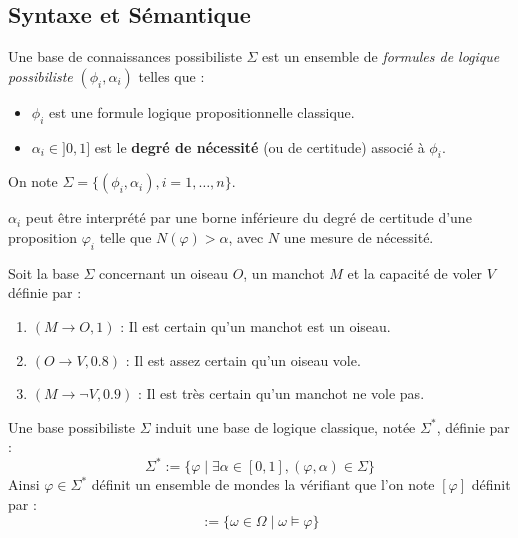 \subsection{Syntaxe et Sémantique}

\begin{definition}
    Une base de connaissances possibiliste $\Sigma$ est un ensemble de \emph{formules de logique 
    possibiliste} $(\phi_i, \alpha_i)$ telles que :
    \begin{itemize}
        \item $\phi_i$ est une formule logique propositionnelle classique.
        \item $\alpha_i \in ]0, 1]$ est le \textbf{degré de nécessité} (ou de certitude) associé à $\phi_i$.
    \end{itemize}
    On note $\Sigma = \{ (\phi_i, \alpha_i), i=1, \dots, n \}$.
\end{definition}

$ \alpha_i $ peut être interprété par une borne inférieure du degré de certitude d'une proposition 
$ \varphi_i$ telle que $ N( \varphi) > \alpha$, avec $N$ une mesure de nécessité. 

\begin{example}
    Soit la base $\Sigma$ concernant un oiseau $O$, un manchot $M$ et la capacité de voler $V$ définie par : 
    \begin{enumerate}
        \item $(M \to O, 1)$ : Il est certain qu'un manchot est un oiseau.
        \item $(O \to V, 0.8)$ : Il est assez certain qu'un oiseau vole.
        \item $(M \to \neg V, 0.9)$ : Il est très certain qu'un manchot ne vole pas.
    \end{enumerate}
\end{example}

Une base possibiliste $ \Sigma$ induit une base de logique classique, notée $ \Sigma^*$, définie par : 
    \begin{equation}
        \Sigma^* := \{ \varphi \mid \exists \alpha \in [0,1], ( \varphi, \alpha) \in \Sigma\}
    \end{equation}
Ainsi $ \varphi \in \Sigma^*$ définit un ensemble de mondes la vérifiant que l'on 
note $[ \varphi]$ définit par : 
    \begin{equation}
        [ \varphi] := \{ \omega \in \Omega \mid \omega \models \varphi\}
    \end{equation}

